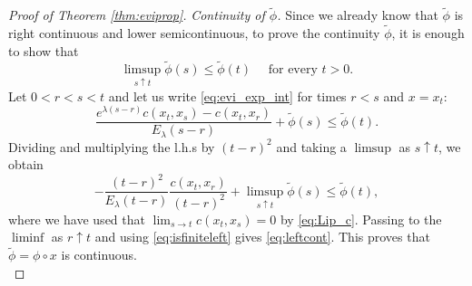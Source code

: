 \documentclass[reqno]{amsart}
\theoremstyle{plain}
\theoremstyle{remark}
\theoremstyle{plain}
\numberwithin{equation}{section}
\theoremstyle{remark}
\begin{document}
\begin{proof}[Proof of Theorem \ref{thm:eviprop}]
\textit{Continuity of $\tilde{\phi}$.} Since we already know that $\tilde{\phi}$ is right continuous and lower semicontinuous, to prove the continuity $\tilde{\phi}$, it is enough to show that
\begin{equation}\label{eq:leftcont}
    \limsup_{s \uparrow t} \tilde{\phi}(s) \le \tilde{\phi}(t) \quad \text{ for every } t>0.
\end{equation}
Let $0<r<s<t$ and let us write \eqref{eq:evi_exp_int} for times $r<s$ and $x=x_t$:
\[
\frac{e^{\lambda(s-r)}c(x_t, x_s) - c(x_t, x_r)}{E_\lambda(s-r)} + \tilde{\phi}(s) \le  \tilde{\phi}(t).
\]
Dividing and multiplying the l.h.s by $(t-r)^2$ and taking a $\limsup$ as $s \uparrow t$, we obtain
\[
-\frac{(t-r)^2}{E_\lambda(t-r)} \frac{c(x_t, x_r)}{(t-r)^2} + \limsup_{s \uparrow t}\tilde{\phi}(s) \le\tilde{\phi}(t),
\]
where we have used that $\lim_{s \to t} c(x_t, x_s)=0$ by \eqref{eq:Lip_c}. Passing to the $\liminf$ as $r \uparrow t$ and using \eqref{eq:isfiniteleft} gives \eqref{eq:leftcont}.  This proves that $\tilde \phi=\phi \circ x$ is continuous.  \\


\end{proof}
\end{document}
